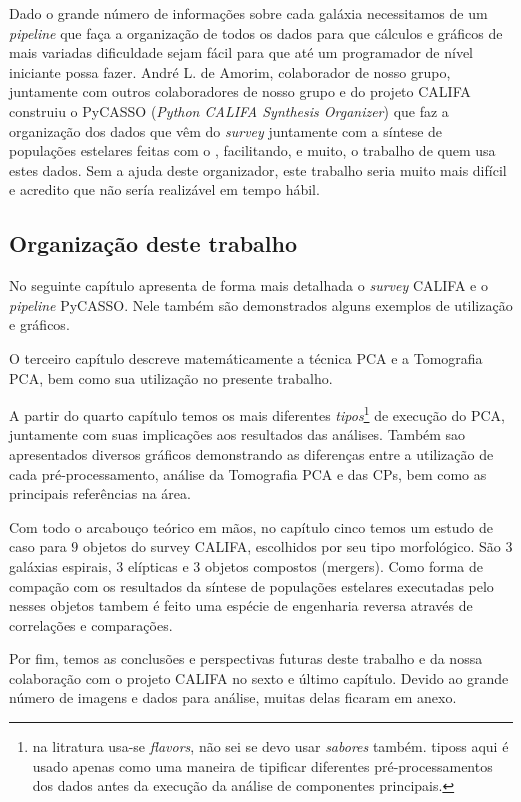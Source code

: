 Dado o grande número de informações sobre cada galáxia necessitamos de um {\em
pipeline} que faça a organização de todos os dados para que cálculos e gráficos
de mais variadas dificuldade sejam fácil para que até um programador de nível
iniciante possa fazer. André L. de Amorim, colaborador de nosso grupo,
juntamente com outros colaboradores de nosso grupo e do projeto CALIFA construiu
o PyCASSO ({\em Python CALIFA \starlight Synthesis Organizer})
\citep[][ cap. 4]{CidFernandes2013a} que faz a organização dos dados que vêm
do {\em survey} juntamente com a síntese de populações estelares feitas com o
\starlight, facilitando, e muito, o trabalho de quem usa estes dados. Sem a
ajuda deste organizador, este trabalho seria muito mais difícil e acredito que
não sería realizável em tempo hábil.

\subsection{Organização deste trabalho}

No seguinte capítulo apresenta de forma mais detalhada o {\em survey}
CALIFA e o {\em pipeline} PyCASSO. Nele também são demonstrados alguns exemplos
de utilização e gráficos.

O terceiro capítulo descreve matemáticamente a técnica PCA e a Tomografia PCA,
bem como sua utilização no presente trabalho. 

A partir do quarto capítulo temos os mais diferentes {\em tipos}\footnote{\ojo
na litratura usa-se {\em flavors}, não sei se devo usar {\em sabores} também.
tiposs aqui é usado apenas como uma maneira de tipificar diferentes
pré-processamentos dos dados antes da execução da análise de componentes
principais.} de execução do PCA, juntamente com suas implicações aos resultados
das análises. Também sao apresentados diversos gráficos demonstrando as
diferenças entre a utilização de cada pré-processamento, análise da
Tomografia PCA e das CPs, bem como as principais referências na área.

Com todo o arcabouço teórico em mãos, no capítulo cinco temos um estudo de caso
para $9$ objetos do survey CALIFA, escolhidos por seu tipo morfológico. São $3$
galáxias espirais, $3$ elípticas e $3$ objetos compostos (mergers). Como forma
de compação com os resultados da síntese de populações estelares executadas pelo
\starlight nesses objetos tambem é feito uma espécie de engenharia reversa
através de correlações e comparações.

Por fim, temos as conclusões e perspectivas futuras deste trabalho e da nossa
colaboração com o projeto CALIFA no sexto e último capítulo. \ojo Devido ao
grande número de imagens e dados para análise, muitas delas ficaram em anexo.

